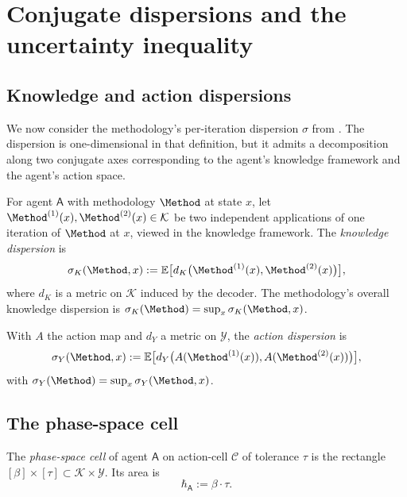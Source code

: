 \documentclass[11pt,twocolumn,a4paper]{article}
\newcommand{\K}{\mathcal{K}}
\newcommand{\Y}{\mathcal{Y}}
\newcommand{\Cell}{\mathcal{C}}
\newcommand{\agent}{\mathsf{A}}
\newcommand{\hbarA}{\hbar_{\agent}}
\begin{document}
\section{Conjugate dispersions and the uncertainty inequality}
\label{sec:dispersions}

\subsection{Knowledge and action dispersions}

We now consider the methodology's per-iteration dispersion $\sigma$ from
. The dispersion is one-dimensional in that definition, but it admits
a decomposition along two conjugate axes corresponding to the agent's knowledge
framework and the agent's action space.

\begin{definition}\label{def:dispK}
For agent $\agent$ with methodology $\Method$ at state $x$, let
$\Method^{(1)}(x), \Method^{(2)}(x) \in \K$ be two independent applications of one
iteration of $\Method$ at $x$, viewed in the knowledge framework. The
\emph{knowledge dispersion} is
\[
\sigma_K(\Method, x) := \mathbb{E}\bigl[d_K\bigl(\Method^{(1)}(x), \Method^{(2)}(x)\bigr)\bigr],
\]
where $d_K$ is a metric on $\K$ induced by the decoder. The methodology's overall
knowledge dispersion is $\sigma_K(\Method) = \sup_x \sigma_K(\Method, x)$.
\end{definition}

\begin{definition}\label{def:dispY}
With $A$ the action map and $d_Y$ a metric on $\Y$, the \emph{action dispersion} is
\[
\sigma_Y(\Method, x) := \mathbb{E}\bigl[d_Y\bigl(A(\Method^{(1)}(x)), A(\Method^{(2)}(x))\bigr)\bigr],
\]
with $\sigma_Y(\Method) = \sup_x \sigma_Y(\Method, x)$.
\end{definition}

\subsection{The phase-space cell}

\begin{definition}\label{def:phasecell}
The \emph{phase-space cell} of agent $\agent$ on action-cell $\Cell$ of tolerance $\tau$
is the rectangle $[\beta] \times [\tau] \subset \K \times \Y$. Its area is
\[
\hbarA := \beta \cdot \tau.
\]
\end{definition}
\end{document}
